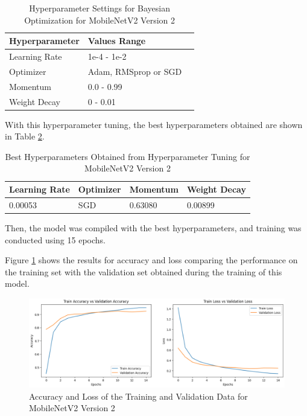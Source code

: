 \documentclass[conference]{IEEEtran}
\begin{document}
\begin{table}[H]
    \centering
    \caption{Hyperparameter Settings for Bayesian Optimization for MobileNetV2 Version 2}
    \renewcommand{\arraystretch}{1.5}
    \begin{tabularx}{0.8\linewidth}{|X|X|X|}
    \hline
    \cellcolor[HTML]{EFEFEF}\textbf{Hyperparameter} & \cellcolor[HTML]{EFEFEF}\textbf{Values Range} \\ \hline
     Learning Rate  &  1e-4 - 1e-2\\ \hline
     Optimizer  &  Adam, RMSprop or SGD\\ \hline
     Momentum  &  0.0 - 0.99\\ \hline
     Weight Decay  &  0 - 0.01\\ \hline
    \end{tabularx}
    \label{tab:hyperparametersMobileNetV2}
\end{table}

With this hyperparameter tuning, the best hyperparameters obtained are shown in Table \ref{tab:resultsHyperparametersMobileNetV2}.

\begin{table}[H]
    \centering
    \caption{Best Hyperparameters Obtained from Hyperparameter Tuning for MobileNetV2 Version 2}
    \renewcommand{\arraystretch}{1.5}
    \begin{tabularx}{1\linewidth}{|X|X|X|X|}
    \hline
    \cellcolor[HTML]{EFEFEF}\textbf{Learning Rate} & \cellcolor[HTML]{EFEFEF}\textbf{Optimizer} & \cellcolor[HTML]{EFEFEF}\textbf{Momentum} & \cellcolor[HTML]{EFEFEF}\textbf{Weight Decay} \\ \hline
     0.00053  & SGD  & 0.63080 & 0.00899 \\ \hline
    \end{tabularx}
    \label{tab:resultsHyperparametersMobileNetV2}
\end{table}

Then, the model was compiled with the best hyperparameters, and training was conducted using 15 epochs.

Figure \ref{fig:acc&LossMobileNetV2} shows the results for accuracy and loss comparing the performance on the training set with the validation set obtained during the training of this model.

\begin{figure}[H]
    \centering
    \includegraphics[width=1\linewidth]{images/acc&LossMobileNetV2_2.png}
    \caption{Accuracy and Loss of the Training and Validation Data for MobileNetV2 Version 2}
    \label{fig:acc&LossMobileNetV2}
\end{figure}
\end{document}
